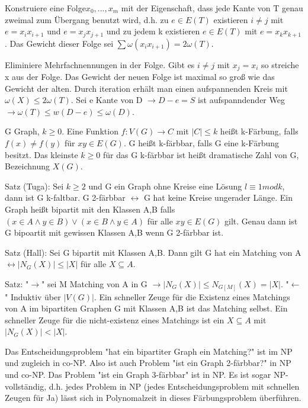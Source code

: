 \documentclass[10pt,landscape]{article}
\begin{document}
\begin{multicols}{3}
Konstruiere eine Folge$x_0,...,x_m$ mit der Eigenschaft, dass jede Kante von T genau zweimal zum Übergang benutzt wird, d.h. zu $e\in E(T)$ existieren $i\not = j$ mit $e=x_i x_{i+1}$ und $e=x_j x_{j+1}$ und zu jedem k existieren $e\in E(T)$ mit $e=x_k x_{k+1}$. Das Gewicht dieser Folge sei $\sum \omega(x_i x_{i+1})= 2\omega(T)$.

Eliminiere Mehrfachnennungen in der Folge. Gibt es $i\not= j$ mit $x_j=x_i$ so streiche x aus der Folge. Das Gewicht der neuen Folge ist maximal so groß wie das Gewicht der alten. Durch iteration erhält man einen aufspannenden Kreis mit $\omega(X) \leq 2 \omega(T)$. Sei e Kante von D $\rightarrow D-e=S$ ist aufspanndender Weg $\rightarrow \omega(T) \leq w(D-e) \leq \omega (D)$.

G Graph, $k\geq 0$. Eine Funktion $f:V(G)\rightarrow C$ mit $|C|\leq k$ heißt k-Färbung, falls $f(x)\not = f(y)$ für $xy\in E(G)$. G heißt k-färbbar, falls G eine k-Färbung besitzt. Das kleinste $k\geq 0$ für das G k-färbbar ist heißt dramatische Zahl von G, Bezeichnung $X(G)$.

Satz (Tuga): Sei $k\geq 2$ und G ein Graph ohne Kreise eine Lösung $l\equiv 1 mod k$, dann ist G k-faltbar. G 2-färbbar $\leftrightarrow$ G hat keine Kreise ungerader Länge. Ein Graph heißt bipartit mit den Klassen A,B falls $(x\in A \wedge y\in B)\vee (x\in B \wedge y\in A)$ für alle $xy \in E(G)$ gilt. Genau dann ist G bipoartit mit gewissen Klassen A,B wenn G 2-färbbar ist.

Satz (Hall): Sei G bipartit mit Klassen A,B. Dann gilt G hat ein Matching von A $\leftrightarrow |N_G(X)|\leq |X|$ für alle $X\subseteq A$.

Satz: "$\rightarrow$" sei M Matching von A in G $\rightarrow |N_G(X)| \leq N_{G[M]}(X)=|X|$. "$\leftarrow$" Induktiv über $|V(G)|$.
Ein schneller Zeuge für die Existenz eines Matchings von A im bipartiten Graphen G mit Klassen A,B ist das Matching selbst. Ein schneller Zeuge für die nicht-existenz eines Matchings ist ein $X\subseteq A$ mit $|N_G(X)| < |X|$.

Das Entscheidungsproblem "hat ein bipartiter Graph ein Matching?" ist im NP und zugleich in co-NP. Also ist auch Problem "ist ein Graph 2-färbbar?" in NP und co-NP. Das Problem "ist ein Graph 3-färbbar" ist in NP. Es ist sogar NP-vollständig, d.h. jedes Problem in NP (jedes Entscheidungsproblem mit schnellen Zeugen für Ja) lässt sich in Polynomalzeit in dieses Färbungsproblem überführen.

\end{multicols}
\end{document}
